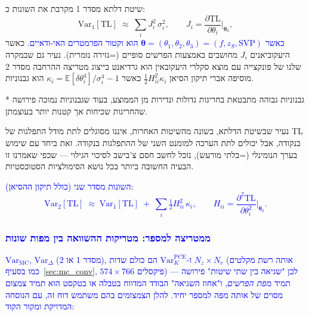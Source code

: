 \documentclass[12pt,a4paper]{article}
\newcommand{\EX}{\mathbb{E}}
\newcommand{\Var}{\mathrm{Var}}
\newcommand{\TL}{\mathrm{TL}}
\DeclareRobustCommand{\aiedit}[1]{\textcolor{blue}{#1}}
\begin{document}
שיטת דלתא מסדר 1 מקרבת את השונות כ:
\begin{equation}
  \Var_1[\TL] \;\approx\; \sum_{i} J_i^2 \,\sigma_i^2,
  \qquad J_i = \frac{\partial \TL}{\partial \theta_i}\bigg|_{\boldsymbol{\theta}_0},
  \label{eq:delta1}
\end{equation}
\aiedit{כאשר $\boldsymbol{\theta}=(\theta_1,\theta_2,\theta_3)=(f,z_S,\mathrm{SVP})$
הוא וקטור הפרמטרים האי-ודאיים.}
כאשר היעקוביאנים $J_i$ מחושבים באמצעות הפרשים סופיים (=גזירה נומרית).
 נעיר גם שבמקרה שלנו של פונקצייה עם מוצא סקלרי היעקובאין הוא גרדיאנט בייצוג מטריצה
ההרחבה מסדר 2 מוסיפה אברי תיקון הסיאן
$\tfrac{1}{2} H_{ii}^2 \kappa_i$ כאשר $\kappa_i = \EX[\delta\theta_i^4]/\sigma_i^4 - 1$
הוא גבנוניות.

* גבנוניות גבוהה מתבטאת בחריגות גדולות ונדירות מן הממוצע, בעוד שגבנוניות נמוכה פירושה שהחריגות שכיחות אך קטנות יותר בעוצמתן.

נעיר שבשיטת הדלתא, בשונה מהשיטות האחרות, איננו מסוגלים לתת מודל התפלגות של TL בנקודה, אבל יכולים לתת הערכה למומנט השני של ההתפלגות בנקודה. זאת ביחד עם שימוש בערך הנומינלי (=בלתי מורעש), נוכל לחשב חסם צ'בישב לסיכוי הגילוי — שכפי שאמרנו זו הבעיה החשובה ביותר בכל נושא הסימולציות הסטוכסטיות.

\aiedit{השונות מסדר שני (כולל תיקון ההסיאן):
\begin{equation}
  \Var_2[\TL] \;\approx\; \Var_1[\TL] \;+\; \sum_i \tfrac{1}{2} H_{ii}^2 \,\kappa_i,
  \qquad H_{ii} = \frac{\partial^2 \TL}{\partial \theta_i^2}\bigg|_{\boldsymbol{\theta}_0}.
  \label{eq:delta2}
\end{equation}}

\subsubsection{\aiedit{ממטריצה למספר: מטריקות ההשוואה בין מפות שונות}}
\label{sec:comparison_metrics}

\aiedit{$\Var_{\mathrm{MC}}$, $\Var_\Delta$ (מסדר 1 או 2), ו-$\Var_K^{\mathrm{PCE}}$ הם כולם שדות
$N_z\times N_r$ (אותה רשת מקלטים כמו בסעיף~\ref{sec:mc_conv}, $574\times766$ פיקסלים) —
לכן "שגיאה בין שתי שיטות" פירושה תמיד \emph{מפת הפרשים}, ו"אחוז השגיאה" הבודד המדווח בטבלה
או בטקסט הוא תמיד צמצום מסוים של אותה מפה למספר יחיד. להלן הצמצומים בהם משתמש דוח זה,
עם הנוסחה המדויקת ומקור הקוד:}
\end{document}

